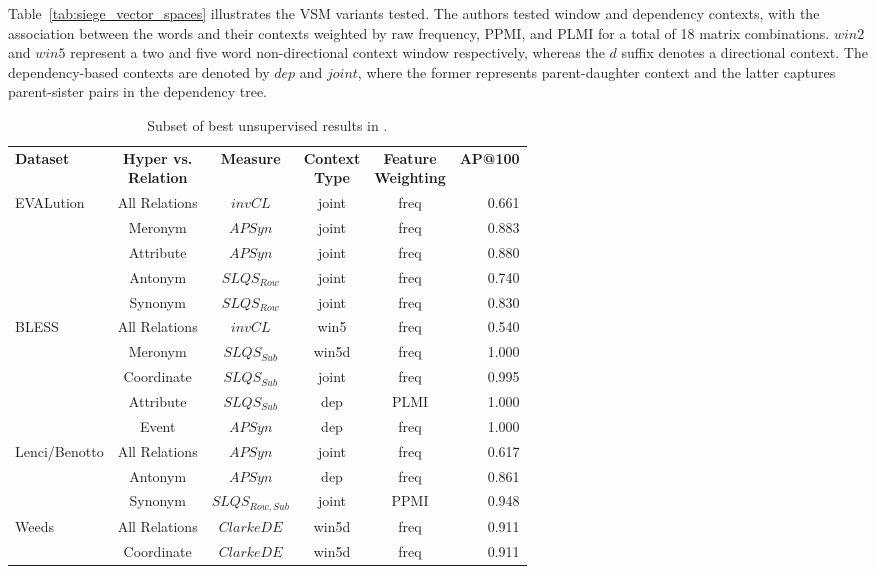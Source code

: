 Table~\ref{tab:siege_vector_spaces} illustrates the \ac{VSM} variants tested.  The authors tested window and dependency contexts, with the association between the words and their contexts weighted by raw frequency, \ac{PPMI}, and \ac{PLMI} for a total of 18 matrix combinations. $win2$ and $win5$ represent a two and five word non-directional context window respectively, whereas the $d$ suffix denotes a directional context.  The dependency-based contexts are denoted by $dep$ and $joint$, where the former represents parent-daughter context and the latter captures parent-sister pairs in the dependency tree.

\begin{table}\centering
    \begin{tabular}{@{}lccccr@{}} \toprule
    \textbf{Dataset} & \shortstack{\textbf{Hyper vs.} \\ \textbf{Relation} } & \textbf{Measure} & \shortstack{\textbf{Context} \\ \textbf{Type} } & \shortstack{\textbf{Feature} \\ \textbf{Weighting}} & \textbf{AP@100} \\ \cmidrule{1-6}
    \multirow{5}{*}{EVALution} & 
    All Relations & $invCL$ & joint & freq & 0.661 \\
    & Meronym & $APSyn$ & joint & freq & 0.883 \\
    & Attribute & $APSyn$ & joint & freq & 0.880 \\
    & Antonym & $SLQS_{Row}$ & joint & freq & 0.740 \\
    & Synonym & $SLQS_{Row}$ & joint & freq & 0.830 \\
    \cmidrule{1-6}
    \multirow{5}{*}{BLESS} & 
    All Relations & $invCL$ & win5 & freq & 0.540 \\
    & Meronym & $SLQS_{Sub}$ & win5d & freq & 1.000 \\
    & Coordinate & $SLQS_{Sub}$ & joint & freq & 0.995 \\
    & Attribute & $SLQS_{Sub}$ & dep & PLMI & 1.000 \\
    & Event & $APSyn$ & dep & freq & 1.000 \\
    \cmidrule{1-6}
    \multirow{3}{*}{Lenci/Benotto} & 
    All Relations & $APSyn$ & joint & freq & 0.617 \\
    & Antonym & $APSyn$ & dep & freq & 0.861 \\
    & Synonym & $SLQS_{Row, Sub}$ & joint & PPMI & 0.948 \\
    \cmidrule{1-6}
    \multirow{2}{*}{Weeds} & 
    All Relations & $ClarkeDE$ & win5d & freq & 0.911 \\
    & Coordinate & $ClarkeDE$ & win5d & freq & 0.911 \\
    \bottomrule
    \end{tabular}
    \caption{Subset of best unsupervised results in \citep{shwartz2017siege}.}\label{tab:siege_unsupervised_results}
\end{table}

